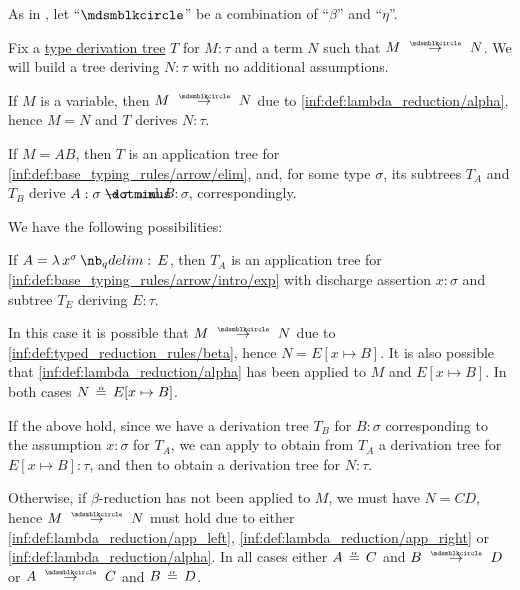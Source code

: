 \begin{algorithm}\label{alg:simply_typed_reduction}
  As in , let \enquote{\( {\Anon} \)} be a combination of \enquote{\( \beta \)} and \enquote{\( \eta \)}.

  Fix a \hyperref[def:type_derivation_tree]{type derivation tree} \( T \) for \( M: \tau \) and a term \( N \) such that \( M \pred N \). We will build a tree deriving \( N: \tau \) with no additional assumptions.

  \begin{thmenum}
     If \( M \) is a variable, then \( M \pred N \) due to \ref{inf:def:lambda_reduction/alpha}, hence \( M = N \) and \( T \) derives \( N: \tau \).

     If \( M = AB \), then \( T \) is an application tree for \ref{inf:def:base_typing_rules/arrow/elim}, and, for some type \( \sigma \), its subtrees \( T_A \) and \( T_B \) derive \( A: \sigma \synimplies \tau \) and \( B: \sigma \), correspondingly.

    We have the following possibilities:
    \begin{thmenum}
       If \( A = \qabs {x^\sigma} E \), then \( T_A \) is an application tree for \ref{inf:def:base_typing_rules/arrow/intro/exp} with discharge assertion \( x: \sigma \) and subtree \( T_E \) deriving \( E: \tau \).

      In this case it is possible that \( M \pred N \) due to \ref{inf:def:typed_reduction_rules/beta}, hence \( N = E[x \mapsto B] \). It is also possible that \ref{inf:def:lambda_reduction/alpha} has been applied to \( M \) and \( E[x \mapsto B] \). In both cases \( N \aequiv E[x \mapsto B] \).

      If the above hold, since we have a derivation tree \( T_B \) for \( B: \sigma \) corresponding to the assumption \( x: \sigma \) for \( T_A \), we can apply  to obtain from \( T_A \) a derivation tree for \( E[x \mapsto B]: \tau \), and then  to obtain a derivation tree for \( N: \tau \).

       Otherwise, if \( \beta \)-reduction has not been applied to \( M \), we must have \( N = CD \), hence \( M \pred N \) must hold due to either \ref{inf:def:lambda_reduction/app_left}, \ref{inf:def:lambda_reduction/app_right} or \ref{inf:def:lambda_reduction/alpha}. In all cases either \( A \aequiv C \) and \( B \pred D \) or \( A \pred C \) and \( B \aequiv D \).


\end{thmenum}
\end{thmenum}
\end{algorithm}
